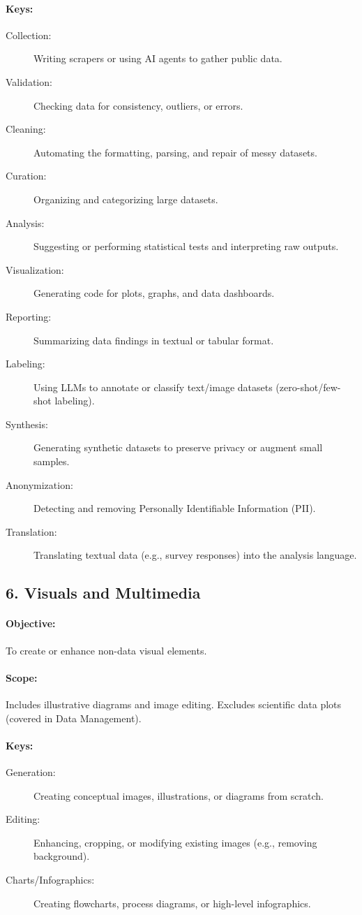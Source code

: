 \documentclass[11pt]{article}
\begin{document}
\paragraph{Keys:}
\begin{description}
    \item[Collection:] Writing scrapers or using AI agents to gather public data.
    \item[Validation:] Checking data for consistency, outliers, or errors.
    \item[Cleaning:] Automating the formatting, parsing, and repair of messy datasets.
    \item[Curation:] Organizing and categorizing large datasets.
    \item[Analysis:] Suggesting or performing statistical tests and interpreting raw outputs.
    \item[Visualization:] Generating code for plots, graphs, and data dashboards.
    \item[Reporting:] Summarizing data findings in textual or tabular format.
    \item[Labeling:] Using LLMs to annotate or classify text/image datasets (zero-shot/few-shot labeling).
    \item[Synthesis:] Generating synthetic datasets to preserve privacy or augment small samples.
    \item[Anonymization:] Detecting and removing Personally Identifiable Information (PII).
    \item[Translation:] Translating textual data (e.g., survey responses) into the analysis language.
\end{description}

\subsection*{6. Visuals and Multimedia}
\paragraph{Objective:} To create or enhance non-data visual elements.
\paragraph{Scope:} Includes illustrative diagrams and image editing.
Excludes scientific data plots (covered in Data Management).
\paragraph{Keys:}
\begin{description}
    \item[Generation:] Creating conceptual images, illustrations, or diagrams from scratch.
    \item[Editing:] Enhancing, cropping, or modifying existing images (e.g., removing background).
    \item[Charts/Infographics:] Creating flowcharts, process diagrams, or high-level infographics.
\end{description}
\end{document}
